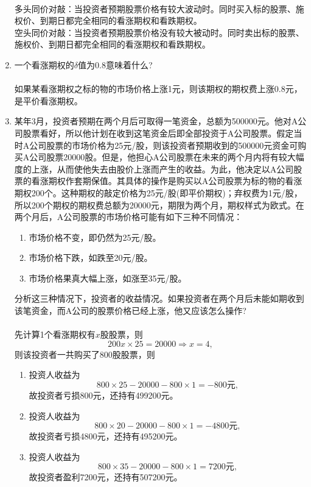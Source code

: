 \begin{enumerate}
    \sol\\
    多头同价对敲：当投资者预期股票价格有较大波动时。同时买入标的股票、施权价、到期日都完全相同的看涨期权和看跌期权。\\
    空头同价对敲：当投资者预期股票价格没有较大被动时。同时卖出标的股票、施权价、到期日都完全相同的看涨期权和看跌期权。
    \item 一个看涨期权的$\delta$值为0.8意味着什么?\\
    \sol\\
    如果某看涨期权之标的物的市场价格上涨1元，则该期权的期权费上涨0.8元，是平价看涨期权。
    \item 某年3月，投资者预期在两个月后可取得一笔资金，总额为500000元。他对A公司股票看好，所以他计划在收到这笔资金后即全部投资于A公司股票。假定当时A公司股票的市场价格为25元/股，则该投资者预期收到的500000元资金可购买A公司股票20000股。但是，他担心A公司股票在未来的两个月内将有较大幅度的上涨，从而使他失去由股价上涨而产生的收益。为此，他决定以A公司股票的看涨期权作套期保值。其具体的操作是购买以A公司股票为标的物的看涨期权200个。这种期权的敲定价格为25元/股(即平价期权)；弃权费为1元/股，所以200个期权的期权费总额为20000元，期限为两个月，期权样式为欧式。在两个月后，A公司股票的市场价格可能有如下三种不同情况：
    \begin{enumerate}[label=(\arabic*)]
        \item 市场价格不变，即仍然为25元/股。
        \item 市场价格下跌，如跌至20元/股。
        \item 市场价格果真大幅上涨，如涨至35元/股。
    \end{enumerate}
    分析这三种情况下，投资者的收益情况。如果投资者在两个月后未能如期收到该笔资金，而A公司的股票价格已经上涨，他又应该怎么操作?\\
    \sol\\
    先计算1个看涨期权有$x$股股票，则
    \[200x \times 25 = 20000 \Rightarrow x = 4,\]
    则该投资者一共购买了800股股票，则
    \begin{enumerate}[label=(\arabic*)]
        \item 投资人收益为
        \[800 \times 25 - 20000 - 800 \times 1 = -800\text{元},\]
        故投资者亏损800元，还持有499200元。
        \item 投资人收益为
        \[800 \times 20 - 20000 - 800 \times 1 = -4800\text{元},\]
        故投资者亏损4800元，还持有495200元。
        \item 投资人收益为
        \[800 \times 35 - 20000 - 800 \times 1 = 7200\text{元},\]
        故投资者盈利7200元，还持有507200元。

\end{enumerate}
\end{enumerate}
